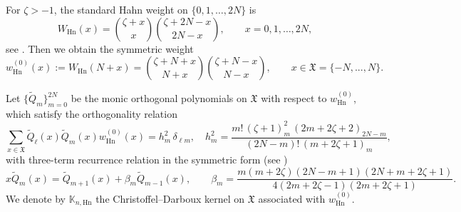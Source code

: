 \documentclass[reqno,11pt]{amsart}
\theoremstyle{plain}
\theoremstyle{definition}
\numberwithin{equation}{section}
\begin{document}
For \(\zeta>-1\), the standard Hahn weight on \(\{0,1,\dots,2N\}\) is
\begin{equation}\label{eq:hahn_weight_standard}
W_{\mathrm{Hn}}(x)
=
\binom{\zeta+x}{x}\binom{\zeta+2N-x}{2N-x},
\qquad x=0,1,\dots,2N,
\end{equation}
see \cite[Ch.9.5]{Koekoek}.
Then we obtain the symmetric weight
\begin{equation}\label{eq:hahn_weight_symmetric}
w_{\mathrm{Hn}}^{(0)}(x)
:=
W_{\mathrm{Hn}}(N+x)
=
\binom{\zeta+N+x}{N+x}\binom{\zeta+N-x}{N-x},
\qquad x\in\mathfrak X=\{-N,...,N\}.
\end{equation}

Let \(\{\widetilde{Q}_m\}_{m=0}^{2N}\) be the monic orthogonal polynomials on \(\mathfrak X\)
with respect to \(w_{\mathrm{Hn}}^{(0)}\),
which satisfy the orthogonality relation
\begin{equation}\label{eq:Hanh_orthogonality}
\sum_{x\in\mathfrak X}
\widetilde{Q}_\ell\!\left(x\right)
\widetilde{Q}_m\!\left(x\right)
w_{\mathrm{Hn}}^{(0)}(x)
=
h_m^2\,\delta_{\ell m}, \quad h_m^2=\frac{m!\,(\zeta+1)_m^2\,(2m+2\zeta+2)_{2N-m}}
{(2N-m)!\,(m+2\zeta+1)_m},
\end{equation} 
with three-term recurrence relation in the symmetric form (see \cite{Koekoek})
\begin{equation}\label{eq:hahn_ttr_symmetric}
x \widetilde{Q}_m(x)=\widetilde{Q}_{m+1}(x)+\beta_m \widetilde{Q}_{m-1}(x),
\qquad 
\beta_m=\frac{m(m+2\zeta)(2N-m+1)(2N+m+2\zeta+1)}
{4(2m+2\zeta-1)(2m+2\zeta+1)}.
\end{equation}
We denote by $\mathbb K_{n,\mathrm{Hn}}$ the Christoffel--Darboux kernel on $\mathfrak X$ associated with $w_{\mathrm{Hn}}^{(0)}$.
\end{document}
